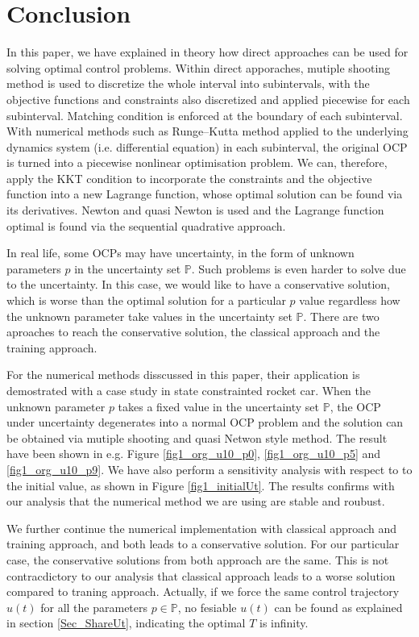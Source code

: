 \documentclass  [
  paper    = a4,
  BCOR     = 10mm,
  twoside,
  fontsize = 12pt,
  fleqn,
  toc      = bibnumbered,
  toc      = listofnumbered,
  numbers  = noendperiod,
  headings = normal,
  listof   = leveldown,
  version  = 3.03
]                                       {scrreprt}
\newcommand{\<}{\langle}
\renewcommand{\>}{\rangle}
\begin{document}
\chapter{Conclusion}
\label{Chapter5}
In this paper, we have explained in theory how direct approaches can be used for solving optimal control problems. Within direct apporaches, mutiple shooting method is used to discretize the whole interval into subintervals, with the objective functions and constraints also discretized and applied piecewise for each subinterval. Matching condition is enforced at the boundary of each subinterval. With numerical methods such as Runge–Kutta method applied to the underlying dynamics system (i.e. differential equation) in each subinterval, the original OCP is turned into a piecewise nonlinear optimisation problem. We can, therefore, apply the KKT condition to incorporate the constraints and the objective function into a new Lagrange function, whose optimal solution can be found via its derivatives. Newton and quasi Newton is used and the Lagrange function optimal is found via the sequential quadrative approach. 

In real life, some OCPs may have uncertainty, in the form of unknown parameters $p$ in the uncertainty set  $\mathbb{P}$. Such problems is even harder to solve due to the uncertainty. In this case, we would like to have a conservative solution, which is worse than the optimal solution for a particular $p$ value regardless how the unknown parameter take values in the uncertainty set $\mathbb{P}$. There are two aproaches to reach the conservative solution, the classical approach and the training approach. 

For the numerical methods disscussed in this paper, their application is demostrated with a case study in state constrainted rocket car. When the unknown parameter $p$ takes a fixed value in the uncertainty set  $\mathbb{P}$, the OCP under uncertainty degenerates into a normal OCP problem and the solution can be obtained via mutiple shooting and quasi Netwon style method. The result have been shown in e.g.  Figure  \ref{fig1_org_u10_p0},  \ref{fig1_org_u10_p5} and \ref{fig1_org_u10_p9}. We have also perform a sensitivity analysis with respect to to the initial value, as shown in Figure \ref{fig1_initialUt}. The results confirms with our analysis that the numerical method we are using are stable and roubust.


We further continue the numerical implementation with classical approach and training approach, and both leads to a conservative solution. For our particular case, the conservative solutions from both approach are  the same. This is not contracdictory to our analysis that classical approach leads to a worse solution compared to traning approach. Actually, if we force the same control trajectory $u(t)$ for all the parameters $p \in \mathbb{P}$, no fesiable $u(t)$ can be found as explained in section \ref{Sec_ShareUt}, indicating the optimal $T$ is infinity. 
\end{document}
